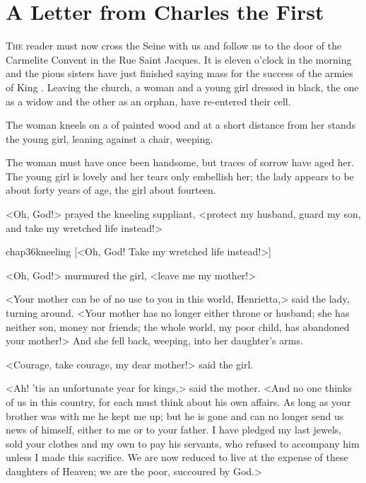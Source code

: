 \chapter{A Letter from Charles the First}

 \lettrine{T}{he} reader must now cross the Seine with us and follow us to the door of the Carmelite Convent in the Rue Saint Jacques. It is eleven o'clock in the morning and the pious sisters have just finished saying mass for the success of the armies of King .  Leaving the church, a woman and a young girl dressed in black, the one as a widow and the other as an orphan, have re-entered their cell.

The woman kneels on a  of painted wood and at a short distance from her stands the young girl, leaning against a chair, weeping.

The woman must have once been handsome, but traces of sorrow have aged her. The young girl is lovely and her tears only embellish her; the lady appears to be about forty years of age, the girl about fourteen.

<Oh, God!> prayed the kneeling suppliant, <protect my husband, guard my son, and take my wretched life instead!>

\begin{bwbigpic}
	[\basicscale] 
	{chap36kneeling}
	[<Oh, God! Take my wretched life instead!>]
\end{bwbigpic}


<Oh, God!> murmured the girl, <leave me my mother!>

<Your mother can be of no use to you in this world, Henrietta,> said the lady, turning around. <Your mother has no longer either throne or husband; she has neither son, money nor friends; the whole world, my poor child, has abandoned your mother!> And she fell back, weeping, into her daughter's arms.

<Courage, take courage, my dear mother!> said the girl.

<Ah! 'tis an unfortunate year for kings,> said the mother. <And no one thinks of us in this country, for each must think about his own affairs. As long as your brother was with me he kept me up; but he is gone and can no longer send us news of himself, either to me or to your father. I have pledged my last jewels, sold your clothes and my own to pay his servants, who refused to accompany him unless I made this sacrifice. We are now reduced to live at the expense of these daughters of Heaven; we are the poor, succoured by God.>

